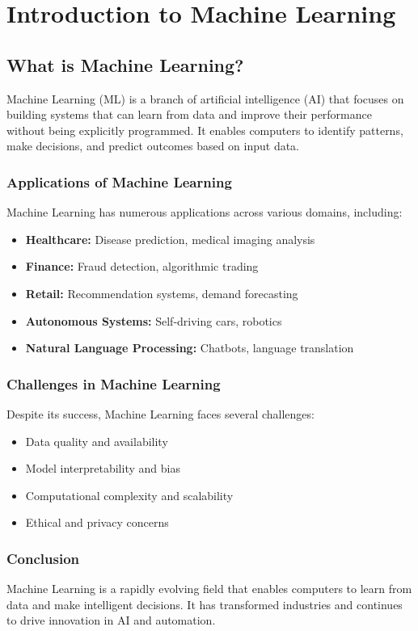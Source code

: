 \chapter{Introduction to Machine Learning}

\section{What is Machine Learning?}
Machine Learning (ML) is a branch of artificial intelligence (AI) that focuses on building systems that can learn from data and improve their performance without being explicitly programmed. It enables computers to identify patterns, make decisions, and predict outcomes based on input data.

\subsection*{Applications of Machine Learning}
Machine Learning has numerous applications across various domains, including:
\begin{itemize}
    \item \textbf{Healthcare:} Disease prediction, medical imaging analysis
    \item \textbf{Finance:} Fraud detection, algorithmic trading
    \item \textbf{Retail:} Recommendation systems, demand forecasting
    \item \textbf{Autonomous Systems:} Self-driving cars, robotics
    \item \textbf{Natural Language Processing:} Chatbots, language translation
\end{itemize}

\subsection*{Challenges in Machine Learning}
Despite its success, Machine Learning faces several challenges:
\begin{itemize}
    \item Data quality and availability
    \item Model interpretability and bias
    \item Computational complexity and scalability
    \item Ethical and privacy concerns
\end{itemize}

\subsection*{Conclusion}
Machine Learning is a rapidly evolving field that enables computers to learn from data and make intelligent decisions. It has transformed industries and continues to drive innovation in AI and automation.

